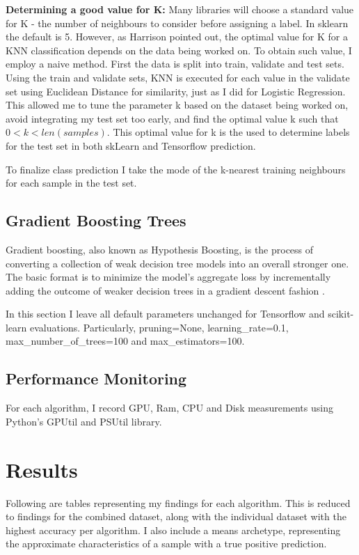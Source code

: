 \documentclass[conference]{IEEEtran}
\begin{document}
\textbf{Determining a good value for K: } Many libraries will choose a standard value for K - the number of neighbours to consider before assigning a label. In sklearn the default is 5\cite{b15}. However, as Harrison pointed out, the optimal value for K for a KNN classification depends on the data being worked on\cite{b16}. To obtain such value, I employ a naive method. First the data is split into train, validate and test sets. Using the train and validate sets, KNN is executed for each value in the validate set using Euclidean Distance for similarity, just as I did for Logistic Regression. This allowed me to tune the parameter k based on the dataset being worked on, avoid integrating my test set too early, and find the optimal value k such that $0 < k < len(samples)$. This optimal value for k is the used to determine labels for the test set in both skLearn and Tensorflow prediction.
 
To finalize class prediction I take the mode of the k-nearest training neighbours for each sample in the test set. 


\subsection{Gradient Boosting Trees}
Gradient boosting, also known as Hypothesis Boosting, is the process of converting a collection of weak decision tree models into an overall stronger one\cite{b17}. The basic format is to minimize the model's aggregate loss by incrementally adding the outcome of weaker decision trees in a gradient descent fashion \cite{b18}.

In this section I leave all default parameters unchanged for Tensorflow and scikit-learn evaluations. Particularly, pruning=None, learning\_rate=0.1, max\_number\_of\_trees=100 and max\_estimators=100.

\subsection{Performance Monitoring}
For each algorithm, I record GPU, Ram, CPU and Disk measurements using Python's GPUtil and PSUtil library. 

\section{Results}
Following are tables representing my findings for each algorithm. This is reduced to findings for the combined dataset, along with the individual dataset with the highest accuracy per algorithm. I also include a means archetype, representing the approximate characteristics of a sample with a true positive prediction. 
\end{document}
